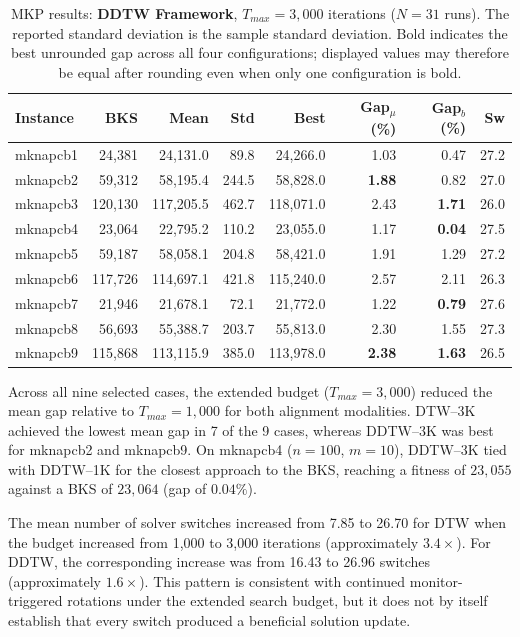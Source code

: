 \begin{table}[htbp]
\centering
\caption{MKP results: \textbf{DDTW Framework}, $T_{max} = 3{,}000$ iterations
($N=31$ runs). The reported standard deviation is the sample standard
deviation. Bold indicates the best unrounded gap across all four
configurations; displayed values may therefore be equal after rounding even
when only one configuration is bold.}
\label{tab:mkp_ddtw_3k}
\begin{tabular}{lrrrrrrr}
\toprule
\textbf{Instance} & \textbf{BKS} & \textbf{Mean} & \textbf{Std} & \textbf{Best} & \textbf{Gap$_\mu$ (\%)} & \textbf{Gap$_b$ (\%)} & \textbf{Sw} \\
\midrule
mknapcb1 & 24,381 & 24,131.0 & 89.8 & 24,266.0 & 1.03 & 0.47 & 27.2 \\
mknapcb2 & 59,312 & 58,195.4 & 244.5 & 58,828.0 & \textbf{1.88} & 0.82 & 27.0 \\
mknapcb3 & 120,130 & 117,205.5 & 462.7 & 118,071.0 & 2.43 & \textbf{1.71} & 26.0 \\
mknapcb4 & 23,064 & 22,795.2 & 110.2 & 23,055.0 & 1.17 & \textbf{0.04} & 27.5 \\
mknapcb5 & 59,187 & 58,058.1 & 204.8 & 58,421.0 & 1.91 & 1.29 & 27.2 \\
mknapcb6 & 117,726 & 114,697.1 & 421.8 & 115,240.0 & 2.57 & 2.11 & 26.3 \\
mknapcb7 & 21,946 & 21,678.1 & 72.1 & 21,772.0 & 1.22 & \textbf{0.79} & 27.6 \\
mknapcb8 & 56,693 & 55,388.7 & 203.7 & 55,813.0 & 2.30 & 1.55 & 27.3 \\
mknapcb9 & 115,868 & 113,115.9 & 385.0 & 113,978.0 & \textbf{2.38} & \textbf{1.63} & 26.5 \\
\bottomrule
\end{tabular}
\end{table}

Across all nine selected cases, the extended budget ($T_{max} = 3{,}000$)
reduced the mean gap relative to $T_{max} = 1{,}000$ for both alignment
modalities. DTW--3K achieved the lowest mean gap in 7 of the 9 cases, whereas
DDTW--3K was best for mknapcb2 and mknapcb9. On mknapcb4 ($n=100$, $m=10$),
DDTW--3K tied with DDTW--1K for the closest approach to the BKS, reaching a
fitness of $23{,}055$ against a BKS of $23{,}064$ (gap of $0.04\%$).

The mean number of solver switches increased from 7.85 to 26.70 for DTW when
the budget increased from 1,000 to 3,000 iterations (approximately $3.4\times$).
For DDTW, the corresponding increase was from 16.43 to 26.96 switches
(approximately $1.6\times$). This pattern is consistent with continued
monitor-triggered rotations under the extended search budget, but it does not
by itself establish that every switch produced a beneficial solution update.






